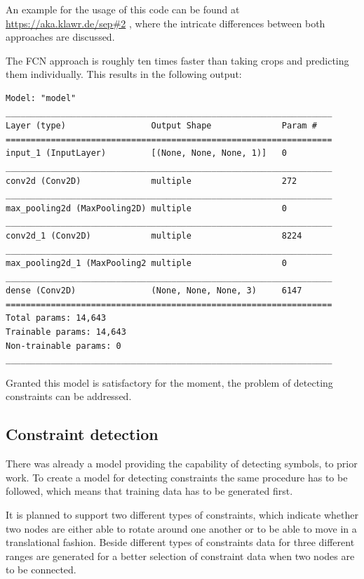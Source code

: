 An example for the usage of this code can be found at \url{https://aka.klawr.de/sep#2} %
, where the intricate differences between both approaches are discussed.

The FCN approach is roughly ten times faster than taking crops and predicting them individually. 
This  results in the following output:

\begin{lstlisting}
Model: "model"
_________________________________________________________________
Layer (type)                 Output Shape              Param #   
=================================================================
input_1 (InputLayer)         [(None, None, None, 1)]   0         
_________________________________________________________________
conv2d (Conv2D)              multiple                  272       
_________________________________________________________________
max_pooling2d (MaxPooling2D) multiple                  0         
_________________________________________________________________
conv2d_1 (Conv2D)            multiple                  8224      
_________________________________________________________________
max_pooling2d_1 (MaxPooling2 multiple                  0         
_________________________________________________________________
dense (Conv2D)               (None, None, None, 3)     6147      
=================================================================
Total params: 14,643
Trainable params: 14,643
Non-trainable params: 0
_________________________________________________________________
\end{lstlisting}

Granted this model is satisfactory for the moment, the problem of detecting constraints can be addressed.

\subsection{Constraint detection}

There was already a model providing the capability of detecting symbols, to prior work.
To create a model for detecting constraints the same procedure has to be followed, which means that training data has to be generated first.

It is planned to support two different types of constraints, which indicate whether two nodes are either able to rotate around one another or to be able to move in a translational fashion.
Beside different types of constraints data for three different ranges are generated for a better selection of constraint data when two nodes are to be connected.

